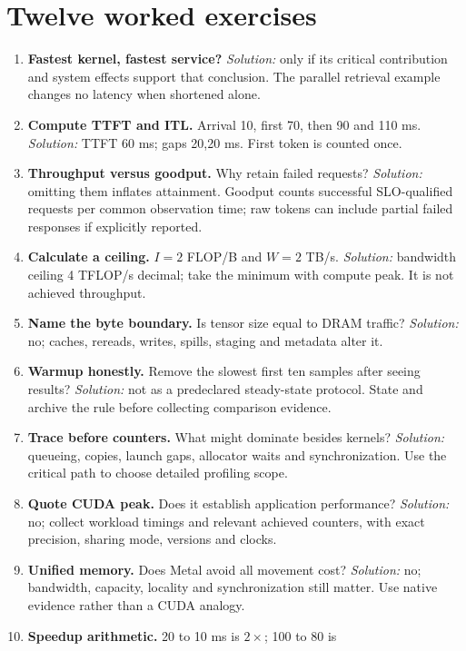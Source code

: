\section{Twelve worked exercises}
\begin{enumerate}
\setlength{\itemsep}{1pt}\setlength{\parsep}{0pt}\setlength{\parskip}{0pt}
\item \textbf{Fastest kernel, fastest service?} \emph{Solution:} only if its
critical contribution and system effects support that conclusion. The parallel
retrieval example changes no latency when shortened alone.
\item \textbf{Compute TTFT and ITL.} Arrival 10, first 70, then 90 and 110 ms.
\emph{Solution:} TTFT 60 ms; gaps 20,20 ms. First token is counted once.
\item \textbf{Throughput versus goodput.} Why retain failed requests?
\emph{Solution:} omitting them inflates attainment. Goodput counts successful
SLO-qualified requests per common observation time; raw tokens can include
partial failed responses if explicitly reported.
\item \textbf{Calculate a ceiling.} $I=2$ FLOP/B and $W=2$ TB/s.
\emph{Solution:} bandwidth ceiling 4 TFLOP/s decimal; take the minimum with
compute peak. It is not achieved throughput.
\item \textbf{Name the byte boundary.} Is tensor size equal to DRAM traffic?
\emph{Solution:} no; caches, rereads, writes, spills, staging and metadata alter it.
\item \textbf{Warmup honestly.} Remove the slowest first ten samples after seeing
results? \emph{Solution:} not as a predeclared steady-state protocol. State and
archive the rule before collecting comparison evidence.
\item \textbf{Trace before counters.} What might dominate besides kernels?
\emph{Solution:} queueing, copies, launch gaps, allocator waits and synchronization.
Use the critical path to choose detailed profiling scope.
\item \textbf{Quote CUDA peak.} Does it establish application performance?
\emph{Solution:} no; collect workload timings and relevant achieved counters,
with exact precision, sharing mode, versions and clocks.
\item \textbf{Unified memory.} Does Metal avoid all movement cost?
\emph{Solution:} no; bandwidth, capacity, locality and synchronization still matter.
Use native evidence rather than a CUDA analogy.
\item \textbf{Speedup arithmetic.} 20 to 10 ms is $2\times$; 100 to 80 is

\end{enumerate}
